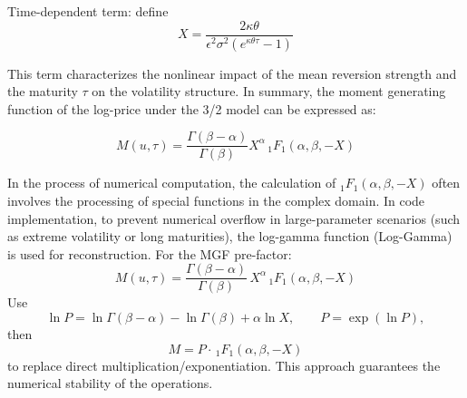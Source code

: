 Time-dependent term: define
$$X=\frac{2\kappa\theta}{\epsilon^2\sigma^2(e^{\kappa\theta\tau}-1)}$$

This term characterizes the nonlinear impact of the mean reversion strength and the maturity $\tau$ on the volatility structure. In summary, the moment generating function of the log-price under the 3/2 model can be expressed as:

$$M(u,\tau)=\frac{\Gamma(\beta-\alpha)}{\Gamma(\beta)}X^\alpha\,_1F_1(\alpha,\beta,-X)$$

In the process of numerical computation, the calculation of $_1F_1(\alpha,\beta,-X)$ often involves the processing of special functions in the complex domain. In code implementation, to prevent numerical overflow in large-parameter scenarios (such as extreme volatility or long maturities), the log-gamma function (Log-Gamma) is used for reconstruction. For the MGF pre-factor:
$$M(u,\tau)=\frac{\Gamma(\beta-\alpha)}{\Gamma(\beta)}\,X^\alpha\,_1F_1(\alpha,\beta,-X)$$
Use
$$\ln P=\ln\Gamma(\beta-\alpha)-\ln\Gamma(\beta)+\alpha\ln X,\qquad P=\exp(\ln P),$$
then
$$M=P\cdot\,_1F_1(\alpha,\beta,-X)$$
to replace direct multiplication/exponentiation. This approach guarantees the numerical stability of the operations.